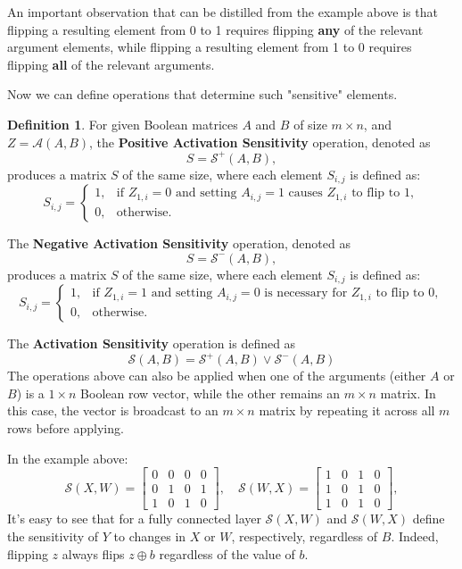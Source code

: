 \documentclass{article}
\theoremstyle{definition}
\newtheorem*{definition}{Definition}
\theoremstyle{remark}
\begin{document}
An important observation that can be distilled from the example above is that flipping a resulting element from 0 to 1 requires flipping \textbf{any} of the relevant argument elements, while flipping a resulting element from 1 to 0 requires flipping \textbf{all} of the relevant arguments.

Now we can define operations that determine such "sensitive" elements.

\begin{definition}
    For given Boolean matrices \( A \) and \( B \) of size \( m \times n \), and \( Z = \mathcal{A}(A, B) \), the \textbf{Positive Activation Sensitivity} operation, denoted as
    \[ S = \mathcal{S}^+(A, B), \]
    produces a matrix \( S \) of the same size, where each element \( S_{i,j} \) is defined as:
    \[ S_{i,j} =
        \begin{cases}
            1, & \text{if } Z_{1,i} = 0 \text{ and setting } A_{i,j} = 1 \text{ causes } Z_{1,i} \text{ to flip to } 1, \\
            0, & \text{otherwise}.
        \end{cases}
    \]

    The \textbf{Negative Activation Sensitivity} operation, denoted as
    \[ S = \mathcal{S}^-(A, B), \]
    produces a matrix \( S \) of the same size, where each element \( S_{i,j} \) is defined as:
    \[ S_{i,j} =
        \begin{cases}
            1, & \text{if } Z_{1,i} = 1 \text{ and setting } A_{i,j} = 0 \text{ is necessary for } Z_{1,i} \text{ to flip to } 0, \\
            0, & \text{otherwise}.
        \end{cases}
    \]

    The \textbf{Activation Sensitivity} operation is defined as
    \[ \mathcal{S}(A, B) = \mathcal{S}^+(A, B) \vee \mathcal{S}^-(A, B) \]
    The operations above can also be applied when one of the arguments (either \( A \) or \( B \)) is a \( 1 \times n \) Boolean row vector, while the other remains an \( m \times n \) matrix. In this case, the vector is broadcast to an \( m \times n \) matrix by repeating it across all \( m \) rows before applying.
\end{definition}

In the example above:
\[
    \mathcal{S}(X, W) = \begin{bmatrix} 0 & 0 & 0 & 0 \\ 0 & 1 & 0 & 1 \\ 1 & 0 & 1 & 0 \end{bmatrix}, \quad
    \mathcal{S}(W, X) = \begin{bmatrix} 1 & 0 & 1 & 0 \\ 1 & 0 & 1 & 0 \\ 1 & 0 & 1 & 0 \end{bmatrix},
\]
It's easy to see that for a fully connected layer \( \mathcal{S}(X, W) \) and \( \mathcal{S}(W, X) \) define the sensitivity of \( Y \) to changes in \( X \) or \( W \), respectively, regardless of \( B \). Indeed, flipping \( z \) always flips \( z \oplus b \) regardless of the value of \( b \).
\end{document}
